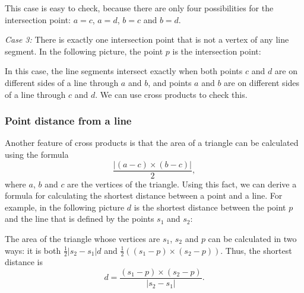 This case is easy to check, because
there are only four possibilities
for the intersection point:
$a=c$, $a=d$, $b=c$ and $b=d$.

\textit{Case 3:}
There is exactly one intersection point
that is not a vertex of any line segment.
In the following picture, the point $p$
is the intersection point:
\begin{center}
\end{center}

In this case, the line segments intersect
exactly when both points $c$ and $d$ are
on different sides of a line through $a$ and $b$,
and points $a$ and $b$ are on different
sides of a line through $c$ and $d$.
We can use cross products to check this.

\subsubsection{Point distance from a line}

Another feature of cross products is that
the area of a triangle can be calculated
using the formula
\[\frac{| (a-c) \times (b-c) |}{2},\]
where $a$, $b$ and $c$ are the vertices of the triangle.
Using this fact, we can derive a formula
for calculating the shortest distance between a point and a line.
For example, in the following picture $d$ is the
shortest distance between the point $p$ and the line
that is defined by the points $s_1$ and $s_2$:
\begin{center}
\end{center}

The area of the triangle whose vertices are
$s_1$, $s_2$ and $p$ can be calculated in two ways:
it is both
$\frac{1}{2} |s_2-s_1| d$ and
$\frac{1}{2} ((s_1-p) \times (s_2-p))$.
Thus, the shortest distance is
\[ d = \frac{(s_1-p) \times (s_2-p)}{|s_2-s_1|} .\]

